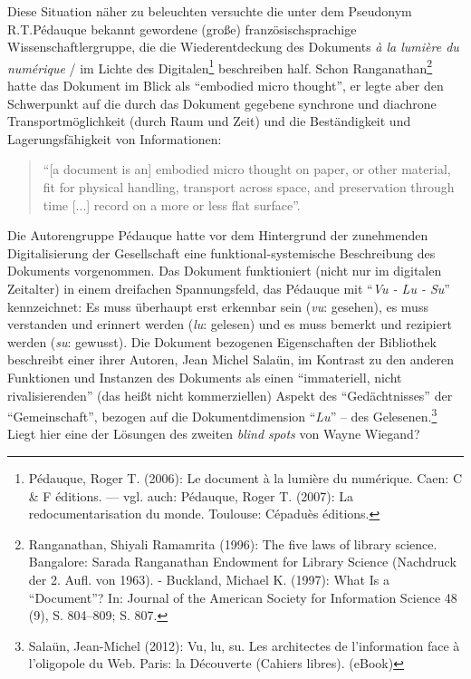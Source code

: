 Diese Situation näher zu beleuchten versuchte die unter dem Pseudonym
R.T.Pédauque bekannt gewordene (große) französischsprachige
Wissenschaftlergruppe, die die Wiederentdeckung des Dokuments \emph{à la
lumière du numérique} / im Lichte des Digitalen\footnote{Pédauque, Roger
  T. (2006): Le document à la lumière du numérique. Caen: C \& F
  éditions. --- vgl. auch: Pédauque, Roger T. (2007): La
  redocumentarisation du monde. Toulouse: Cépaduès éditions.}
beschreiben half. Schon Ranganathan\footnote{Ranganathan, Shiyali
  Ramamrita (1996): The five laws of library science. Bangalore: Sarada
  Ranganathan Endowment for Library Science (Nachdruck der 2. Aufl. von
  1963). - Buckland, Michael K. (1997): What Is a \enquote{Document}?
  In: Journal of the American Society for Information Science 48 (9), S.
  804--809; S. 807.} hatte das Dokument im Blick als \enquote{embodied
micro thought}, er legte aber den Schwerpunkt auf die durch das Dokument
gegebene synchrone und diachrone Transportmöglichkeit (durch Raum und
Zeit) und die Beständigkeit und Lagerungsfähigkeit von Informationen:

\begin{flushleft}
\begin{quote}
\enquote{{[}a document is an{]} embodied micro thought on paper, or
other material, fit for physical handling, transport across space, and
preservation through time {[}...{]} record on a more or less flat
surface}.
\end{quote}
\end{flushleft}

Die Autorengruppe Pédauque hatte vor dem Hintergrund der zunehmenden
Digitalisierung der Gesellschaft eine funktional-systemische
Beschreibung des Dokuments vorgenommen. Das Dokument funktioniert (nicht
nur im digitalen Zeitalter) in einem dreifachen Spannungsfeld, das
Pédauque mit \enquote{\emph{Vu - Lu - Su}} kennzeichnet: Es muss
überhaupt erst erkennbar sein (\emph{vu}: gesehen), es muss verstanden
und erinnert werden (\emph{lu}: gelesen) und es muss bemerkt und
rezipiert werden (\emph{su}: gewusst). Die Dokument bezogenen
Eigenschaften der Bibliothek beschreibt einer ihrer Autoren, Jean Michel
Salaün, im Kontrast zu den anderen Funktionen und Instanzen des
Dokuments als einen \enquote{immateriell, nicht rivalisierenden} (das
heißt nicht kommerziellen) Aspekt des \enquote{Gedächtnisses} der
\enquote{Gemeinschaft}, bezogen auf die Dokumentdimension
\enquote{\emph{Lu}} -- des Gelesenen.\footnote{Salaün, Jean-Michel
  (2012): Vu, lu, su. Les architectes de l'information face à
  l'oligopole du Web. Paris: la Découverte (Cahiers libres). (eBook)}
Liegt hier eine der Lösungen des zweiten \emph{blind spots} von Wayne
Wiegand?

